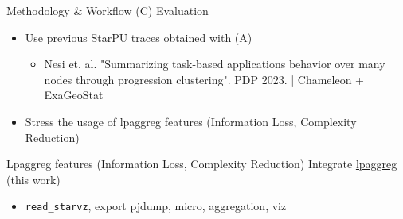 \documentclass[12pt,xcolor=dvipsnames,presentation,aspectratio=169]{beamer}
\begin{document}
{\begin{frame}[label={sec:orge965911},fragile]{Methodology \& Workflow}
(C) Evaluation
\begin{itemize}
\item Use previous StarPU traces obtained with (A)
\begin{itemize}
\item Nesi et. al. "Summarizing task-based applications behavior over
many nodes through progression clustering". PDP 2023. |
Chameleon + ExaGeoStat
\end{itemize}
\item Stress the usage of lpaggreg features (Information Loss, Complexity Reduction)
\end{itemize}
\end{frame}
\begin{frame}[label={sec:org5e20003},fragile]{Lpaggreg features (Information Loss, Complexity Reduction)}
 Integrate \uline{lpaggreg} (this work)
\begin{itemize}
\item \texttt{read\_starvz}, export pjdump, micro, aggregation, viz
\end{itemize}


\end{frame}}
\end{document}

